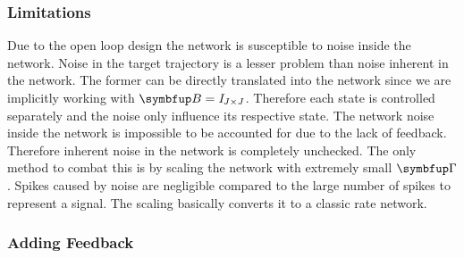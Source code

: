 \subsubsection{Limitations}

Due to the open loop design the network is susceptible to noise inside the network. Noise in the target trajectory is a lesser problem than noise inherent in the network. The former can be directly translated into the network since we are implicitly working with $\bmu{B} = \mathit{I}_{J\times J}$. Therefore each state is controlled separately and the noise only influence its respective state. The network noise inside the network is impossible to be accounted for due to the lack of feedback. Therefore inherent noise in the network is completely unchecked. The only method to combat this is by scaling the network with extremely small $\bmu{\Gamma}$. Spikes caused by noise are negligible compared to the large number of spikes to represent a signal. The scaling basically converts it to a classic rate network.\\

\subsubsection{Adding Feedback}

